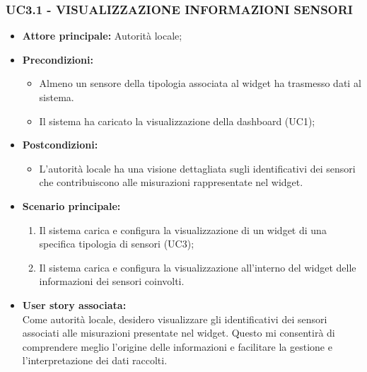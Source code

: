 \subsubsection{UC3.1 - VISUALIZZAZIONE INFORMAZIONI SENSORI}
\begin{itemize}
    \item \textbf{Attore principale:} Autorità locale;
    \item \textbf{Precondizioni:}
        \begin{itemize}
            \item Almeno un sensore della tipologia associata al widget ha trasmesso dati al sistema.
            \item Il sistema ha caricato la visualizzazione della dashboard (UC1);
        \end{itemize}
    \item \textbf{Postcondizioni:}
        \begin{itemize}
            \item L’autorità locale ha una visione dettagliata sugli identificativi dei sensori che contribuiscono alle misurazioni rappresentate nel widget.
        \end{itemize}
    \item \textbf{Scenario principale:}
        \begin{enumerate}
            \item Il sistema carica e configura la visualizzazione di un widget di una specifica tipologia di sensori (UC3);
            \item Il sistema carica e configura la visualizzazione all'interno del widget delle informazioni dei sensori coinvolti.
        \end{enumerate}
    \item \textbf{User story associata:} \\
        Come autorità locale, desidero visualizzare gli identificativi dei sensori associati alle misurazioni presentate nel widget. Questo mi consentirà di comprendere meglio l'origine delle informazioni e facilitare la gestione e l'interpretazione dei dati raccolti.
\end{itemize}

